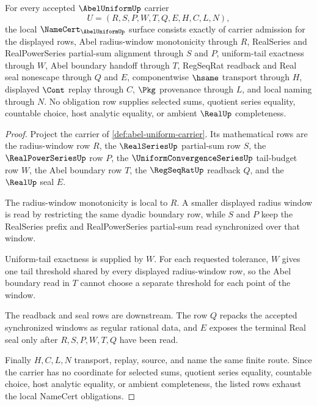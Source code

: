 \begin{theorem}
\label{thm:abel-uniform-namecert-obligations}
For every accepted $\AbelUniformUp$ carrier
$$
U=(R,S,P,W,T,Q,E,H,C,L,N),
$$
the local $\NameCert_{\AbelUniformUp}$ surface consists exactly of carrier admission for the displayed rows, Abel radius-window monotonicity through $R$, RealSeries and RealPowerSeries partial-sum alignment through $S$ and $P$, uniform-tail exactness through $W$, Abel boundary handoff through $T$, RegSeqRat readback and Real seal nonescape through $Q$ and $E$, componentwise $\hsame$ transport through $H$, displayed $\Cont$ replay through $C$, $\Pkg$ provenance through $L$, and local naming through $N$. No obligation row supplies selected sums, quotient series equality, countable choice, host analytic equality, or ambient $\RealUp$ completeness.
\end{theorem}
\begin{proof}
Project the carrier of \autoref{def:abel-uniform-carrier}. Its mathematical rows are the radius-window row $R$, the $\RealSeriesUp$ partial-sum row $S$, the $\RealPowerSeriesUp$ row $P$, the $\UniformConvergenceSeriesUp$ tail-budget row $W$, the Abel boundary row $T$, the $\RegSeqRatUp$ readback $Q$, and the $\RealUp$ seal $E$.

The radius-window monotonicity is local to $R$. A smaller displayed radius window is read by restricting the same dyadic boundary row, while $S$ and $P$ keep the RealSeries prefix and RealPowerSeries partial-sum read synchronized over that window.

Uniform-tail exactness is supplied by $W$. For each requested tolerance, $W$ gives one tail threshold shared by every displayed radius-window row, so the Abel boundary read in $T$ cannot choose a separate threshold for each point of the window.

The readback and seal rows are downstream. The row $Q$ repacks the accepted synchronized windows as regular rational data, and $E$ exposes the terminal Real seal only after $R,S,P,W,T,Q$ have been read.

Finally $H,C,L,N$ transport, replay, source, and name the same finite route. Since the carrier has no coordinate for selected sums, quotient series equality, countable choice, host analytic equality, or ambient completeness, the listed rows exhaust the local NameCert obligations.
\end{proof}

